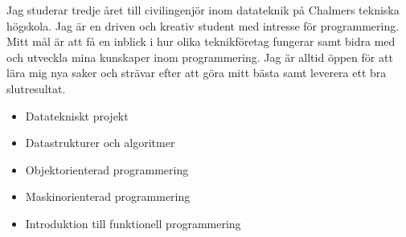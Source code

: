 







Jag studerar tredje året till civilingenjör 
inom datateknik på Chalmers tekniska
högskola. Jag är en driven och kreativ 
student med intresse för programmering. 
Mitt mål är att få en inblick i hur olika
teknikföretag fungerar samt bidra med och
utveckla mina kunskaper inom programmering. 
Jag är alltid öppen för att lära mig nya 
saker och strävar efter att göra mitt 
bästa samt leverera ett bra slutresultat.





\begin{itemize}
    \item Datatekniskt projekt
    \item Datastrukturer och algoritmer
    \item Objektorienterad programmering
    \item Maskinorienterad programmering
    \item Introduktion till funktionell programmering
\end{itemize}

